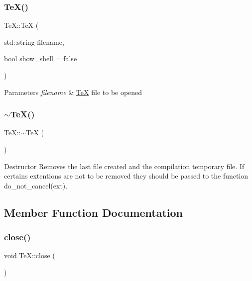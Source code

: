 \subsubsection{\texorpdfstring{Te\+X()}{TeX()}\hspace{0.1cm}{\footnotesize\ttfamily [2/2]}}
{\footnotesize\ttfamily Te\+X\+::\+TeX (\begin{DoxyParamCaption}\item[{std\+::string}]{filename,  }\item[{bool}]{show\+\_\+shell = {\ttfamily false} }\end{DoxyParamCaption})}


\begin{DoxyParams}{Parameters}
{\em filename} & \hyperlink{class_te_x}{TeX} file to be opened \\
\hline
\end{DoxyParams}
\mbox{\label{class_te_x_ade9e129defdfd30770f256aa178684a3}} 
\subsubsection{\texorpdfstring{$\sim$\+Te\+X()}{~TeX()}}
{\footnotesize\ttfamily Te\+X\+::$\sim$\+TeX (\begin{DoxyParamCaption}{ }\end{DoxyParamCaption})}

Destructor Removes the last file created and the compilation temporary file. If certains extentions are not to be removed they should be passed to the function do\+\_\+not\+\_\+cancel(ext). 

\subsection{Member Function Documentation}
\mbox{\label{class_te_x_a6b702106c0b4391ba8bd28aa50298074}} 
\subsubsection{\texorpdfstring{close()}{close()}}
{\footnotesize\ttfamily void Te\+X\+::close (\begin{DoxyParamCaption}{ }\end{DoxyParamCaption})\hspace{0.3cm}{\ttfamily [inline]}}

